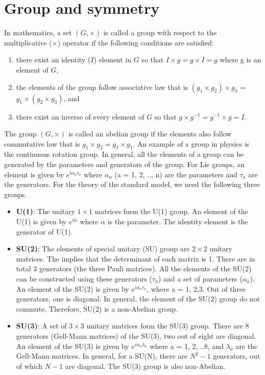 
\section{Group and symmetry}
\label{s:smGroup}
In mathematics, a set $(G, \times)$ is called a group with respect to the 
multiplicative ($\times$) operator if the following conditions are satisfied: 
\begin{enumerate}
\item there exist an identity ($I$) element in $G$ so that $I\times g = g\times I = 
g$ where g is an element of $G$, 
\item the elements of the group follow associative 
law that is $(g_1\times g_2)\times g_3$ = $g_1\times (g_2\times g_3)$, and 
\item there exist an inverse of every element of $G$ so that $g\times g^{-1} = g^{-1}\times g = I$. 
\end{enumerate}
The group $(G, \times)$ is called an abelian group if 
the elements also follow commutative law that is $g_1\times g_2 = g_2\times g_1$. An example of a group in physics is the continuous rotation group. In general,
all the elements of a group can be generated by the parameters and generators 
of the group. For Lie groups, an element is given by $e^{i\alpha_a\tau_a}$ where
$\alpha_a$ (a = 1, 2, .., n) are the parameters and $\tau_a$ are the generators. For the theory 
of the standard model, we need the following three groups.
\begin{itemize} [leftmargin=*]
				\item \textbf{U(1)}: The unitary $1\times 1$ matrices form the U(1) 
								group. An element of the U(1) is given by $e^{i\alpha}$ where 
								$\alpha$ is the parameter. The identity element is the 
								generator of U(1).
				\item \textbf{SU(2)}: The elements of special unitary (SU) group are 
								$2\times 2$ unitary matrices. The  implies that the
								determinant of each matrix is 1. There are in total 3 generators
								(the three Pauli matrices). All the elements of the SU(2) can be 
								constructed using these generators ($\tau_a$) and a set of 
								parameters ($\alpha_a$). An element of the SU(2) is given by 
								$e^{i\alpha_a\tau_a}$, where a = 1, 2,3. Out of three generators,
								one is diagonal. In general, the element of the SU(2) group do not 
								commute. Therefore, SU(2) is a non-Abelian group.
				\item \textbf{SU(3)}: A set of $3\times 3$ unitary matrices form the
								SU(3) group. There are 8 generators (Gell-Mann matrices) of the
								SU(3), two out of eight are diagonal. An element of the SU(3) 
								is given by $e^{i\alpha_a\lambda_a}$ where a = 1, 2, ..8, and
								$\lambda_a$ are the Gell-Mann matrices. In general, for a SU(N), 
								there are $N^2 -1$ generators, out of which $N-1$ are diagonal. 
								The SU(3) group is also non-Abelian.
\end{itemize}

